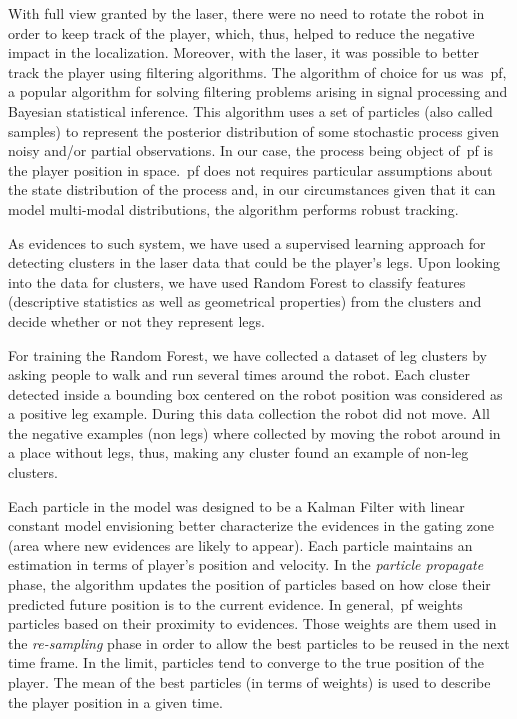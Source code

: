 With full view granted by the laser, there were no need to rotate the robot in order to keep track of the player, which, thus, helped to reduce the negative impact in the localization. Moreover, with the laser, it was possible to better track the player using filtering algorithms. The algorithm of choice for us was~\gls{pf}, a popular algorithm for solving filtering problems arising in signal processing and Bayesian statistical inference. This algorithm uses a set of particles (also called samples) to represent the posterior distribution of some stochastic process given noisy and/or partial observations. In our case, the process being object of~\gls{pf} is the player position in space.~\gls{pf} does not requires particular assumptions about the state distribution of the process and, in our circumstances given that it can model multi-modal distributions, the algorithm performs robust tracking.

As evidences to such system, we have used a supervised learning approach for detecting clusters in the laser data that could be the player's legs. Upon looking into the data for clusters, we have used Random Forest to classify features (descriptive statistics as well as geometrical properties) from the clusters and decide whether or not they represent legs. 

For training the Random Forest, we have collected a dataset of leg clusters by asking people to walk and run several times around the robot. Each cluster detected inside a bounding box centered on the robot position was considered as a positive leg example. During this data collection the robot did not move. All the negative examples (non legs) where collected by moving the robot around in a place without legs, thus, making any cluster found an example of non-leg clusters. 

Each particle in the model was designed to be a Kalman Filter with linear constant model envisioning better characterize the evidences in the gating zone (area where new evidences are likely to appear). Each particle maintains an estimation in terms of player's position and velocity. In the \textit{particle propagate} phase, the algorithm updates the position of particles based on how close their predicted future position is to the current evidence. In general,~\gls{pf} weights particles based on their proximity to evidences. Those weights are them used in the \textit{re-sampling} phase in order to allow the best particles to be reused in the next time frame. In the limit, particles tend to converge to the true position of the player. The mean of the best particles (in terms of weights) is used to describe the player position in a given time.

